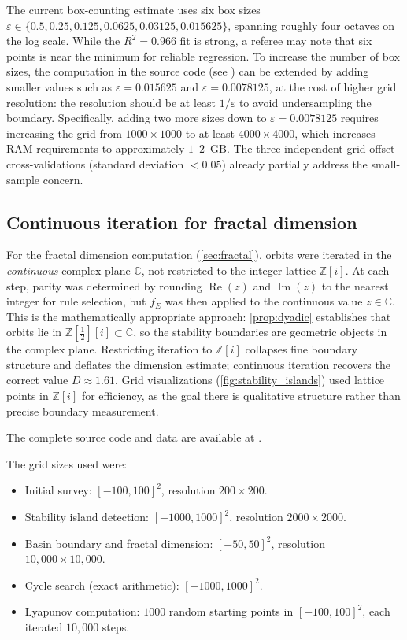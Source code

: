 \documentclass[12pt]{article}
\theoremstyle{plain}
\theoremstyle{definition}
\theoremstyle{remark}
\theoremstyle{definition}
\newcommand{\Z}{\mathbb{Z}}
\newcommand{\Zi}{\mathbb{Z}[i]}
\newcommand{\re}{\operatorname{Re}}
\newcommand{\im}{\operatorname{Im}}
\begin{document}
The current box-counting estimate uses six box sizes
$\varepsilon \in \{0.5, 0.25, 0.125, 0.0625, 0.03125, 0.015625\}$,
spanning roughly four octaves on the log scale.
While the $R^2 = 0.966$ fit is strong, a referee may note that
six points is near the minimum for reliable regression.
To increase the number of box sizes, the computation in the source
code (see \cite{garg2026zenodo}) can be extended by adding smaller
values such as $\varepsilon = 0.015625$ and $\varepsilon =
0.0078125$, at the cost of higher grid resolution: the resolution
should be at least $1/\varepsilon$ to avoid undersampling the
boundary. Specifically, adding two more sizes down to
$\varepsilon = 0.0078125$ requires increasing the grid from
$1000 \times 1000$ to at least $4000 \times 4000$, which increases
RAM requirements to approximately $1$--$2$~GB.
The three independent grid-offset cross-validations
(standard deviation $< 0.05$) already partially address the
small-sample concern.

\subsection*{Continuous iteration for fractal dimension}

For the fractal dimension computation (\cref{sec:fractal}), orbits were
iterated in the \emph{continuous} complex plane $\mathbb{C}$, not
restricted to the integer lattice $\Zi$.
At each step, parity was determined by rounding $\re(z)$ and $\im(z)$
to the nearest integer for rule selection, but $f_E$ was then applied
to the continuous value $z \in \mathbb{C}$.
This is the mathematically appropriate approach: \cref{prop:dyadic}
establishes that orbits lie in $\Z[\tfrac{1}{2}][i] \subset \mathbb{C}$,
so the stability boundaries are geometric objects in the complex plane.
Restricting iteration to $\Zi$ collapses fine boundary structure and
deflates the dimension estimate; continuous iteration recovers the
correct value $D \approx 1.61$.
Grid visualizations (\cref{fig:stability_islands}) used lattice points
in $\Zi$ for efficiency, as the goal there is qualitative structure
rather than precise boundary measurement.

The complete source code and data are available at \cite{garg2026zenodo}.

The grid sizes used were:
\begin{itemize}
    \item Initial survey: $[-100,100]^2$, resolution $200 \times 200$.
    \item Stability island detection: $[-1000,1000]^2$,
          resolution $2000 \times 2000$.
    \item Basin boundary and fractal dimension:
          $[-50, 50]^2$, resolution $10{,}000 \times 10{,}000$.
    \item Cycle search (exact arithmetic): $[-1000,1000]^2$.
    \item Lyapunov computation: $1000$ random starting points
          in $[-100,100]^2$, each iterated $10{,}000$ steps.
\end{itemize}
\end{document}
